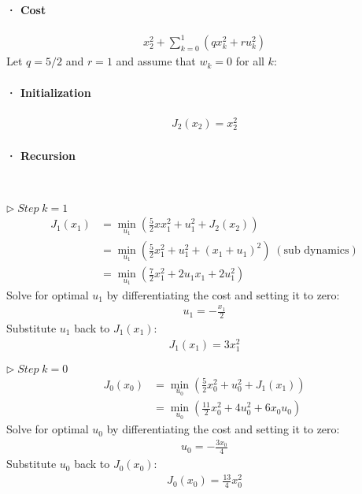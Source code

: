 \documentclass[8pt, a4paper, oneside, justified]{article}
\numberwithin{equation}{section}
\begin{document}
\paragraph*{· Cost}

\begin{align}
    x^2_2+\sum\limits_{k=0}^{1}(qx_k^2+ru_k^2)
\end{align}
Let $q = 5/2$ and $r = 1$ and assume that $w_k=0$ for all $k$:
\paragraph*{· Initialization}

\begin{align}
    J_2(x_2)=x_2^2
\end{align}

\paragraph*{· Recursion}~{}

$\rhd \;Step\;k=1$
\begin{align}
    J_1(x_1)& = \min_ {u_1} (\frac{5}{2}xx_1^2+u_1^2+J_2(x_2)) \\
    & = \min_ {u_1}(\frac{5}{2}x_1^2+u_1^2+(x_1+u_1)^2)\;(\text{sub dynamics}) \\
    & = \min_ {u_1}(\frac{7}{2}x_1^2+2u_1x_1+2u_1^2)
\end{align}
\hspace{8pt} Solve for optimal $u_1$ by differentiating the cost and setting it to zero:
\begin{align}
    u_1=-\frac{x_1}{2}
\end{align}
\hspace{8pt} Substitute $u_1$ back to $J_1(x_1)$:
\begin{align}
    J_1(x_1)=3x_1^2
\end{align}

$\rhd \;Step\;k=0$
\begin{align}
    J_0(x_0) & = \min_ {u_0}(\frac{5}{2}x_0^2+u_0^2+J_1(x_1)) \\
    & = \min_ {u_0}(\frac{11}{2}x_0^2+4u_0^2+6x_0u_0)
\end{align}
\hspace{8pt} Solve for optimal $u_0$ by differentiating the cost and setting it to zero:
\begin{align}
    u_0 = -\frac{3x_0}{4}
\end{align}
\hspace{8pt} Substitute $u_0$ back to $J_0(x_0)$:
\begin{align}
    J_0(x_0) = \frac{13}{4}x_0^2
\end{align}
\end{document}
